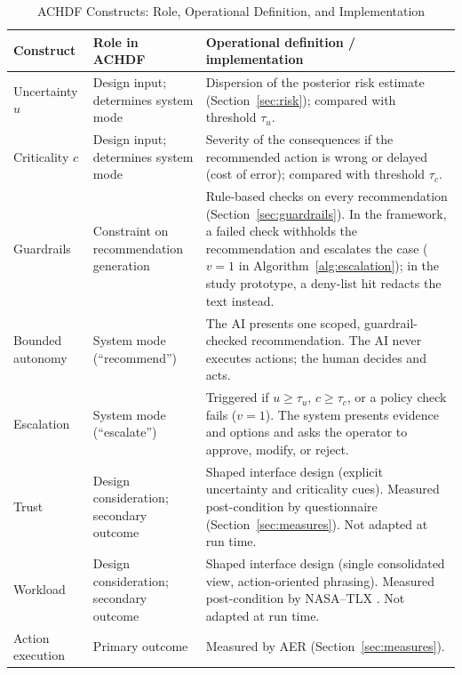 \documentclass[journal]{IEEEtran}
\theoremstyle{plain}
\theoremstyle{definition}
\providecommand{\DIFaddbegin}{} %
\newcommand{\DIFaddincludegraphics}[2][]{{\color{blue}\fbox{\DIFOincludegraphics[#1]{#2}}}} %
\DeclareRobustCommand{\DIFaddbegin}{\DIFOaddbegin \let\includegraphics\DIFaddincludegraphics} %
\begin{document}
\DIFaddbegin \begin{table}[t]
\centering
\caption{ACHDF Constructs: Role, Operational Definition, and Implementation}
\label{tab:constructs}
\begin{tabular}{p{2.4cm} p{3.4cm} p{10.6cm}}
\toprule
\textbf{Construct} & \textbf{Role in ACHDF} & \textbf{Operational definition / implementation} \\
\midrule
Uncertainty $u$ & Design input; determines system mode & Dispersion of the posterior risk estimate (Section~\ref{sec:risk}); compared with threshold $\tau_u$. \\
Criticality $c$ & Design input; determines system mode & Severity of the consequences if the recommended action is wrong or delayed (cost of error); compared with threshold $\tau_c$. \\
Guardrails & Constraint on recommendation generation & Rule-based checks on every recommendation (Section~\ref{sec:guardrails}). In the framework, a failed check withholds the recommendation and escalates the case ($v=1$ in Algorithm~\ref{alg:escalation}); in the study prototype, a deny-list hit redacts the text instead. \\
Bounded autonomy & System mode (``recommend'') & The AI presents one scoped, guardrail-checked recommendation. The AI never executes actions; the human decides and acts. \\
Escalation & System mode (``escalate'') & Triggered if $u \ge \tau_u$, $c \ge \tau_c$, or a policy check fails ($v=1$). The system presents evidence and options and asks the operator to approve, modify, or reject. \\
Trust & Design consideration; secondary outcome & Shaped interface design (explicit uncertainty and criticality cues). Measured post-condition by questionnaire (Section~\ref{sec:measures}). Not adapted at run time. \\
Workload & Design consideration; secondary outcome & Shaped interface design (single consolidated view, action-oriented phrasing). Measured post-condition by NASA--TLX \cite{Hart1988}. Not adapted at run time. \\
Action execution & Primary outcome & Measured by AER (Section~\ref{sec:measures}). \\
\bottomrule
\end{tabular}
\end{table}
\end{document}
